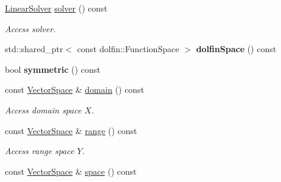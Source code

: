 \begin{DoxyCompactItemize}
\item 
\hyperlink{namespaceSpacy_a4cd614ddb41dd29e68a723dadd5602f2}{Linear\+Solver} \hyperlink{classSpacy_1_1FEniCS_1_1LinearOperator_aa5aacfc25bb0d710f56c2323753d451f}{solver} () const 
\begin{DoxyCompactList}\small\item\em Access solver. \end{DoxyCompactList}\item 
\hypertarget{classSpacy_1_1FEniCS_1_1LinearOperator_a9edb2a6eac66a2379792ef5580fcae75}{}std\+::shared\+\_\+ptr$<$ const dolfin\+::\+Function\+Space $>$ {\bfseries dolfin\+Space} () const \label{classSpacy_1_1FEniCS_1_1LinearOperator_a9edb2a6eac66a2379792ef5580fcae75}

\item 
\hypertarget{classSpacy_1_1FEniCS_1_1LinearOperator_aa83aaeab285efbb5d636054d06550d64}{}bool {\bfseries symmetric} () const \label{classSpacy_1_1FEniCS_1_1LinearOperator_aa83aaeab285efbb5d636054d06550d64}

\item 
\hypertarget{classSpacy_1_1OperatorBase_a2588f9b3e0188820c4c494e63293dc6f}{}const \hyperlink{classSpacy_1_1VectorSpace}{Vector\+Space} \& \hyperlink{classSpacy_1_1OperatorBase_a2588f9b3e0188820c4c494e63293dc6f}{domain} () const \label{classSpacy_1_1OperatorBase_a2588f9b3e0188820c4c494e63293dc6f}

\begin{DoxyCompactList}\small\item\em Access domain space $X$. \end{DoxyCompactList}\item 
\hypertarget{classSpacy_1_1OperatorBase_ab19d3b7a6f290b1079248f1e567e53d6}{}const \hyperlink{classSpacy_1_1VectorSpace}{Vector\+Space} \& \hyperlink{classSpacy_1_1OperatorBase_ab19d3b7a6f290b1079248f1e567e53d6}{range} () const \label{classSpacy_1_1OperatorBase_ab19d3b7a6f290b1079248f1e567e53d6}

\begin{DoxyCompactList}\small\item\em Access range space $Y$. \end{DoxyCompactList}\item 
\hypertarget{classSpacy_1_1VectorBase_aa999dbf9d679d895dfe04c10fbf9f5e9}{}const \hyperlink{classSpacy_1_1VectorSpace}{Vector\+Space} \& \hyperlink{classSpacy_1_1VectorBase_aa999dbf9d679d895dfe04c10fbf9f5e9}{space} () const \label{classSpacy_1_1VectorBase_aa999dbf9d679d895dfe04c10fbf9f5e9}


\end{DoxyCompactItemize}
